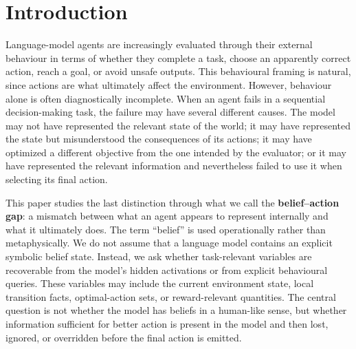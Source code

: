 \documentclass[final]{sparreport}
\begin{document}

\section{Introduction}\label{sec:intro}
Language-model agents are increasingly evaluated through their external behaviour in terms of whether they complete a task, choose an apparently correct action, reach a goal, or avoid unsafe outputs. This behavioural framing is natural, since actions are what ultimately affect the environment. However, behaviour alone is often diagnostically incomplete. When an agent fails in a sequential decision-making task, the failure may have several different causes. The model may not have represented the relevant state of the world; it may have represented the state but misunderstood the consequences of its actions; it may have optimized a different objective from the one intended by the evaluator; or it may have represented the relevant information and nevertheless failed to use it when selecting its final action.

This paper studies the last distinction through what we call the \textbf{belief--action gap}: a mismatch between what an agent appears to represent internally and what it ultimately does. The term ``belief'' is used operationally rather than metaphysically. We do not assume that a language model contains an explicit symbolic belief state. Instead, we ask whether task-relevant variables are recoverable from the model's hidden activations or from explicit behavioural queries. These variables may include the current environment state, local transition facts, optimal-action sets, or reward-relevant quantities. The central question is not whether the model has beliefs in a human-like sense, but whether information sufficient for better action is present in the model and then lost, ignored, or overridden before the final action is emitted.
\end{document}
